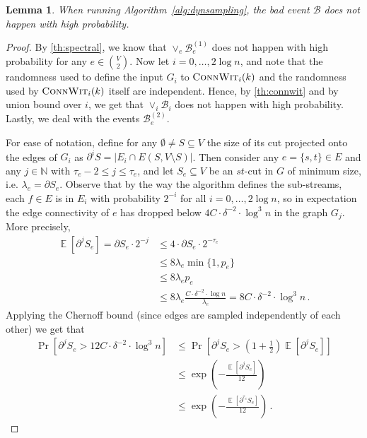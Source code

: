 \documentclass[epsfig,letter,11pt]{article}
\numberwithin{equation}{section}
\DeclareMathOperator{\ex}{\mathbb{E}}
\newcommand{\uncutg}[1]{{\partial} #1}
\newtheorem{lemma}[theorem]{Lemma}
\begin{document}
\begin{lemma}
	\label{lem:failsampling}
	When running Algorithm~\ref{alg:dynsampling}, the bad event $\mathcal{B}$ does not happen with high probability.
\end{lemma}
\begin{proof}
	By \cref{th:spectral}, we know that $\vee_{e} \mathcal{B}^{(1)}_e$ does not happen with high probability for any $e \in \binom{V}{2}$. Now let $i=0,\dots, 2 \log n$, and note that the randomness used to define the input $G_i$ to $\textsc{ConnWit}_i(k)$ and the randomness used by $\textsc{ConnWit}_i(k)$ itself are independent. Hence, by \cref{th:connwit} and by union bound over $i$, we get that $\vee_{i}\mathcal{B}_i$ does not happen with high probability.  Lastly, we deal with the events $\mathcal{B}^{(2)}_e$.
	
	For ease of notation, define for any $\emptyset \neq S \subseteq V$ the size of its cut projected onto the edges of $G_i$ as $\partial^i S=|E_i \cap E(S,V \setminus S)|$. Then consider any $e=\{s,t\} \in E$ and any $j  \in \mathbb{N}$ with $\tau_e-2 \le j \le \tau_e$, and let $S_e \subseteq V$ be an $st$-cut in $G$ of minimum size, i.e. $\lambda_e = \uncutg{S_e}$. Observe that by the way the algorithm defines the sub-streams, each $f \in E$ is in $E_i$ with probability $2^{-i}$ for all $i=0, \dots, 2 \log n$, so in expectation the edge connectivity of $e$ has dropped below $4 C \cdot \delta^{-2}\cdot \log^3 n$ in the graph $G_{j}$. More precisely,
	\begin{align*}
		\ex[\partial^{j} S_e] = \uncutg{S_e} \cdot 2^{-j} & \le 4\cdot \uncutg{S_e} \cdot 2^{-\tau_e} \\
		&  \le 8\lambda_e \min\{1,  p_e\} \\
		& \le 8\lambda_e p_e  \\
		& \le 8 \lambda_e \frac{C \cdot \delta^{-2}\cdot \log n}{\lambda_e} = 8 C \cdot \delta^{-2}\cdot \log^3 n \, .
	\end{align*}
	Applying the Chernoff bound (since edges are sampled independently of each other)  we get that
	\begin{align*}
		\Pr\left[\partial^{j} S_e > 12 C \cdot \delta^{-2}\cdot \log^3 n \right] & \le \Pr\left[\partial^{j} S_e > \left(1+\frac{1}{2}\right) \ex[\partial^{j} S_e] \right] \\
		& \le \exp\left(-\frac{\ex[\partial^{j} S_e]}{12}\right) \\
		& \le \exp\left(-\frac{\ex[\partial^{\tau_e} S_e]}{12}\right)\, .
	\end{align*}

\end{proof}
\end{document}
